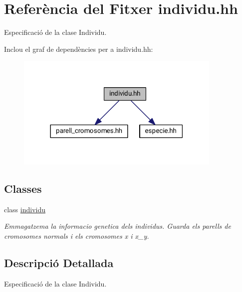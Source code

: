 \hypertarget{individu_8hh}{}\section{Referència del Fitxer individu.\+hh}
\label{individu_8hh}


Especificació de la clase Individu.  


Inclou el graf de dependències per a individu.\+hh\+:
\nopagebreak
\begin{figure}[H]
\begin{center}
\leavevmode
\includegraphics[width=278pt]{individu_8hh__incl}
\end{center}
\end{figure}
\subsection*{Classes}
\begin{DoxyCompactItemize}
\item 
class \hyperlink{classindividu}{individu}
\begin{DoxyCompactList}\small\item\em Emmagatzema la informacio genetica dels individus. Guarda els parells de cromosomes normals i els cromosomes x i x\+\_\+y. \end{DoxyCompactList}\end{DoxyCompactItemize}


\subsection{Descripció Detallada}
Especificació de la clase Individu. 

